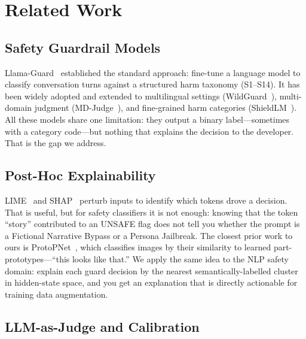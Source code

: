 \documentclass[letterpaper]{article}
\begin{document}
\section{Related Work}

\subsection{Safety Guardrail Models}

Llama-Guard~\cite{inan2023llamaguard} established the standard approach: fine-tune a language
model to classify conversation turns against a structured harm taxonomy (S1--S14).
It has been widely adopted and extended to multilingual settings (WildGuard~\cite{wildguard2024}),
multi-domain judgment (MD-Judge~\cite{zhu2023mdjudge}), and fine-grained harm categories
(ShieldLM~\cite{zeng2024shieldlm}). All these models share one limitation:
they output a binary label---sometimes with a category code---but nothing that explains
the decision to the developer. That is the gap we address.

\subsection{Post-Hoc Explainability}

LIME~\cite{ribeiro2016lime} and SHAP~\cite{lundberg2017shap} perturb inputs to
identify which tokens drove a decision. That is useful, but for safety classifiers it is
not enough: knowing that the token ``story'' contributed to an UNSAFE flag does not tell
you whether the prompt is a Fictional Narrative Bypass or a Persona Jailbreak.
The closest prior work to ours is ProtoPNet~\cite{chen2019looks}, which classifies
images by their similarity to learned part-prototypes---``this looks like that.'' We
apply the same idea to the NLP safety domain: explain each guard decision by the nearest
semantically-labelled cluster in hidden-state space, and you get an explanation that is
directly actionable for training data augmentation.

\subsection{LLM-as-Judge and Calibration}
\end{document}
